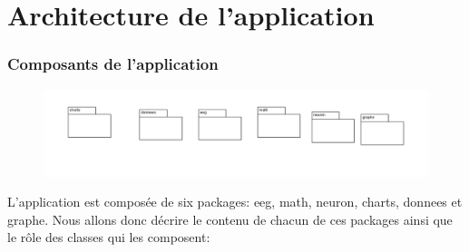 \part{Architecture de l'application} %
\label{prt:architecture_ _de_ _l_'_application_}
	
	\section{Composants de l'application} %
	\label{sec:composant_de_l_application}
	\begin{figure}[h!]
			\centering
		    \includegraphics []{../diagramme_classes/packages.png} \\
			\label{fig_pack}
	\end{figure}
	L'application est composée de six packages: eeg, math, neuron, charts, donnees et graphe. Nous allons donc décrire le contenu de chacun de ces packages ainsi que le rôle des classes qui les composent:
